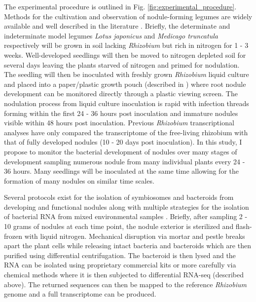 The experimental procedure is outlined in Fig. \ref{fig:experimental_procedure}. 
Methods for the cultivation and observation of nodule-forming legumes are widely
available and well described in the literature \cite{Journet:2006ws,
Sasaki:2013wj, Diaz:2005ud}. Briefly, the determinate and indeterminate model
legumes \textit{Lotus japonicus} and \textit{Medicago truncatula} respectively
will be grown in soil lacking \textit{Rhizobium} but rich in nitrogen for 1 -
3 weeks. Well-developed seedlings will then be moved to nitrogen depleted soil
for several days leaving the plants starved of nitrogen and primed for
nodulation. The seedling will then be inoculated with freshly grown
\textit{Rhizobium} liquid culture and placed into a paper/plastic growth pouch
(described in \citet{Journet:2006ws}) where root nodule development can be
monitored directly through a plastic viewing screen. The nodulation process from
liquid culture inoculation is rapid with infection threads forming within the
first 24 - 36 hours post inoculation and immature nodules visible within 48
hours post inoculation. Previous \textit{Rhizobium} transcriptional analyses
have only compared the transcriptome of the free-living rhizobium with that of
fully developed nodules (10 - 20 days post inoculation). In this study, I propose to
monitor the bacterial development of nodules over many stages of development
sampling numerous nodule from many individual plants every 24 - 36 hours.
Many seedlings will be inoculated at the same time allowing for the formation of
many nodules on similar time scales.

Several protocols exist for the isolation of symbiosomes and bacteroids from
developing and functional nodules \cite{Wienkoop:2005wu, Kazandjian:2008vu,
Panter:2000wj} along with multiple strategies for the isolation of bacterial RNA
from mixed environmental samples \cite{Wang:2012gj, Stark:2014ea} . Briefly,
after sampling 2 - 10 grams of nodules at each time point, the nodule exterior is
sterilized and flash-frozen with liquid nitrogen. Mechanical disruption via
mortar and pestle breaks apart the plant cells while releasing intact bacteria
and bacteroids which are then purified using differential centrifugation. The
bacteroid is then lysed and the RNA can be isolated using proprietary commercial kits or more
carefully via chemical methods \cite{Sessitsch:2002vq} where it is then
subjected to differential RNA-seq (described above). The returned sequences can
then be mapped to the reference \textit{Rhizobium} genome and a full
transcriptome can be produced.

